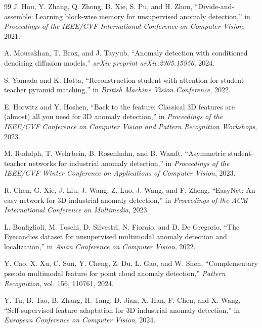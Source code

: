 \documentclass[10pt,conference]{IEEEtran}
\begin{document}
\begin{thebibliography}{99}
J. Hou, Y. Zhang, Q. Zhong, D. Xie, S. Pu, and H. Zhou, ``Divide-and-
assemble: Learning block-wise memory for unsupervised anomaly detection,''
in \emph{Proceedings of the IEEE/CVF International Conference on Computer
Vision}, 2021.

A. Mousakhan, T. Brox, and J. Tayyub, ``Anomaly detection with conditioned
denoising diffusion models,'' \emph{arXiv preprint arXiv:2305.15956}, 2024.

S. Yamada and K. Hotta, ``Reconstruction student with attention for
student-teacher pyramid matching,'' in \emph{British Machine Vision
Conference}, 2022.

E. Horwitz and Y. Hoshen, ``Back to the feature: Classical 3D features are
(almost) all you need for 3D anomaly detection,'' in \emph{Proceedings of
the IEEE/CVF Conference on Computer Vision and Pattern Recognition
Workshops}, 2023.

M. Rudolph, T. Wehrbein, B. Rosenhahn, and B. Wandt, ``Asymmetric student-
teacher networks for industrial anomaly detection,'' in \emph{Proceedings
of the IEEE/CVF Winter Conference on Applications of Computer Vision},
2023.

R. Chen, G. Xie, J. Liu, J. Wang, Z. Luo, J. Wang, and F. Zheng,
``EasyNet: An easy network for 3D industrial anomaly detection,'' in
\emph{Proceedings of the ACM International Conference on Multimedia}, 2023.

L. Bonfiglioli, M. Toschi, D. Silvestri, N. Fioraio, and D. De Gregorio,
``The Eyecandies dataset for unsupervised multimodal anomaly detection and
localization,'' in \emph{Asian Conference on Computer Vision}, 2022.

Y. Cao, X. Xu, C. Sun, Y. Cheng, Z. Du, L. Gao, and W. Shen, ``Complementary
pseudo multimodal feature for point cloud anomaly detection,''
\emph{Pattern Recognition}, vol. 156, 110761, 2024.

Y. Tu, B. Tao, B. Zhang, H. Tang, D. Jian, X. Han, F. Chen, and X. Wang,
``Self-supervised feature adaptation for 3D industrial anomaly detection,''
in \emph{European Conference on Computer Vision}, 2024.


\end{thebibliography}
\end{document}
